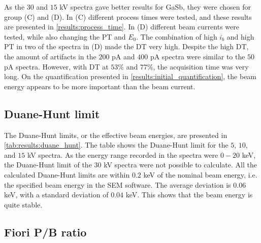 As the $30$ and $15$ kV spectra gave better results for GaSb, they were chosen for group (C) and (D).
In (C) different process times were tested, and these results are presented in \cref{results:process_time}.
In (D) different beam currents were tested, while also changing the PT and $E_0$.
The combination of high $i_b$ and high PT in two of the spectra in (D) made the DT very high.
Despite the high DT, the amount of artifacts in the $200$ pA and $400$ pA spectra were similar to the $50$ pA spectra.
However, with DT at $53$\% and $77$\%, the acquisition time was very long.
On the quantification presented in \cref{results:initial_quantification}, the beam energy appears to be more important than the beam current.








\subsection{Duane-Hunt limit}
\label{results:duane_hunt}

The Duane-Hunt limits, or the effective beam energies, are presented in \cref{tab:results:duane_hunt}.
The table shows the Duane-Hunt limit for the $5$, $10$, and $15$ kV spectra.
As the energy range recorded in the spectra were $0-20$ keV, the Duane-Hunt limit of the $30$ kV spectra were not possible to calculate.
All the calculated Duane-Hunt limits are within $0.2$ keV of the nominal beam energy, i.e. the specified beam energy in the SEM software.
The average deviation is $0.06$ keV, with a standard deviation of $0.04$ keV.
This shows that the beam energy is quite stable.





\subsection{Fiori P/B ratio}
\label{results:fiori}

